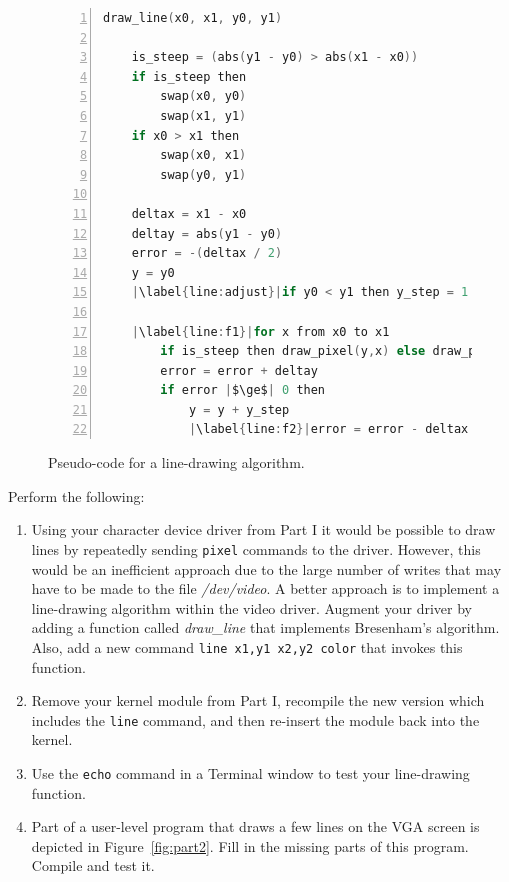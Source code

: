 \documentclass[epsfig,10pt,fullpage]{article}
\begin{document}
\begin{figure}[h]
\begin{center}
\begin{minipage}[t]{12.5 cm}
		  \begin{lstlisting}[language=C, morekeywords={then}, numbers=left,name=bresenham]
draw_line(x0, x1, y0, y1)

	is_steep = (abs(y1 - y0) > abs(x1 - x0))
	if is_steep then
		swap(x0, y0)
		swap(x1, y1)
	if x0 > x1 then
		swap(x0, x1)
		swap(y0, y1)

	deltax = x1 - x0
	deltay = abs(y1 - y0)
	error = -(deltax / 2)
	y = y0
	|\label{line:adjust}|if y0 < y1 then y_step = 1 else y_step = -1

	|\label{line:f1}|for x from x0 to x1
		if is_steep then draw_pixel(y,x) else draw_pixel(x,y)
		error = error + deltay
		if error |$\ge$| 0 then
			y = y + y_step
			|\label{line:f2}|error = error - deltax
\end{lstlisting}
\end{minipage}
\caption{Pseudo-code for a line-drawing algorithm.}
\label{fig:bresenham}
\end{center}
\end{figure}

\newpage
\noindent
Perform the following:

\begin{enumerate}

\item Using your character device driver from Part I it would be possible to draw lines by 
repeatedly sending \texttt{pixel} commands to the driver. However, this would be an inefficient
approach due to the large number of writes that may have to be made to the file {\it /dev/video}.
A better approach is to implement a line-drawing algorithm within the video driver. Augment
your driver by adding a function called {\it draw\_line} that implements Bresenham's algorithm.
Also, add a new command \texttt{line x1,y1 x2,y2 color} that invokes this function.
		  
\item Remove your kernel module from Part I, recompile the new version which includes the
\texttt{line} command, and then re-insert the module back into the kernel.
\item Use the \texttt{echo} command in a Terminal window to test your line-drawing function.
\item Part of a user-level program that draws a few lines on the VGA screen is depicted in
Figure~\ref{fig:part2}. Fill in the missing parts of this program. Compile and test it.
\end{enumerate}
\end{document}
